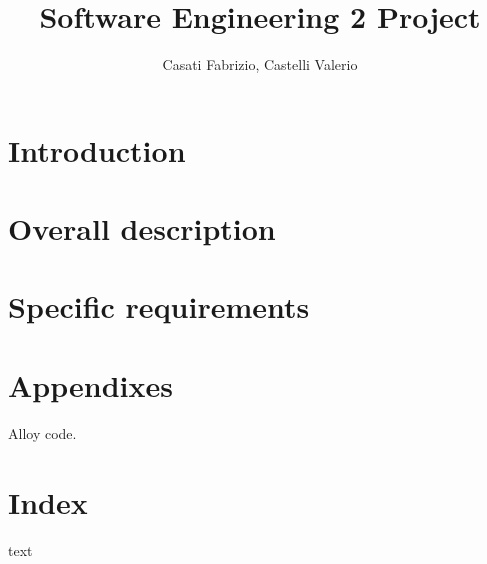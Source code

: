 




\title{Software Engineering 2 Project}
\author{Casati Fabrizio, Castelli Valerio}

\maketitle
\tableofcontents

\chapter{Introduction}


\chapter{Overall description}


\chapter{Specific requirements}


\chapter*{Appendixes}
Alloy code.

\chapter*{Index}
text

